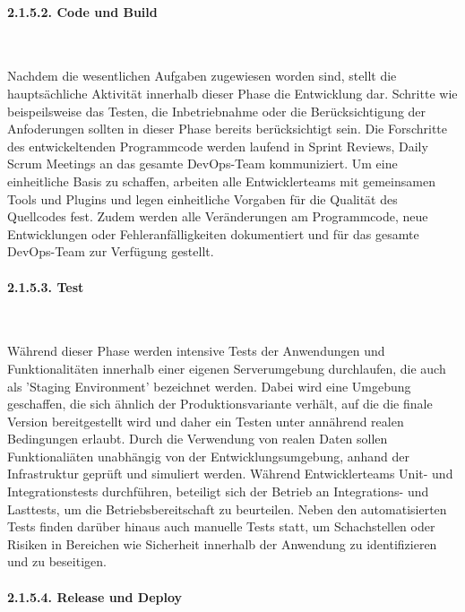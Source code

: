 \paragraph{2.1.5.2. Code und Build} $~$

Nachdem die wesentlichen Aufgaben zugewiesen worden sind, stellt die hauptsächliche Aktivität innerhalb dieser Phase die Entwicklung dar. Schritte wie beispeilsweise das Testen, die Inbetriebnahme oder die Berücksichtigung der Anfoderungen sollten in dieser Phase bereits berücksichtigt sein. \cite[S. 18]{halstenberg_devops_2020} Die Forschritte des entwickeltenden Programmcode werden laufend in Sprint Reviews, Daily Scrum Meetings an das gesamte DevOps-Team kommuniziert. Um eine einheitliche Basis zu schaffen, arbeiten alle Entwicklerteams mit gemeinsamen Tools und Plugins und legen einheitliche Vorgaben für die Qualität des Quellcodes fest. Zudem werden alle Veränderungen am Programmcode, neue Entwicklungen oder Fehleranfälligkeiten dokumentiert und für das gesamte DevOps-Team zur Verfügung gestellt.

\paragraph{2.1.5.3. Test} $~$

Während dieser Phase werden intensive Tests der Anwendungen und Funktionalitäten innerhalb einer eigenen Serverumgebung durchlaufen, die auch als 'Staging Environment' bezeichnet werden. \cite[S. 16]{verona_practical_2016} Dabei wird eine Umgebung geschaffen, die sich ähnlich der Produktionsvariante verhält, auf die die finale Version bereitgestellt wird und daher ein Testen unter annährend realen Bedingungen erlaubt. \cite[S. 5.2/5.6]{bass_devops_2015} Durch die Verwendung von realen Daten sollen Funktionaliäten unabhängig von der Entwicklungsumgebung, anhand der Infrastruktur geprüft und simuliert werden. \cite[S. 16]{verona_practical_2016} Während Entwicklerteams Unit- und Integrationstests durchführen, beteiligt sich der Betrieb an Integrations- und Lasttests, um die Betriebsbereitschaft zu beurteilen. \cite[S. 127]{sturm_devops_2017} Neben den automatisierten Tests finden darüber hinaus auch manuelle Tests statt, um Schachstellen oder Risiken in Bereichen wie Sicherheit innerhalb der Anwendung zu identifizieren und zu beseitigen.

\paragraph{2.1.5.4. Release und Deploy} $~$

